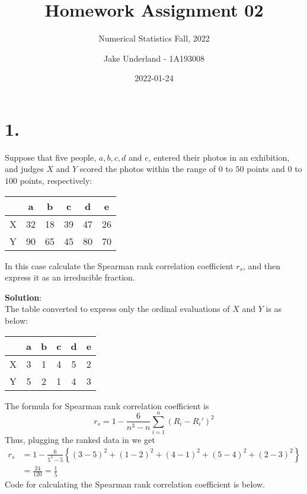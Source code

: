 \documentclass[
]{article}
\title{Homework Assignment 02}
\subtitle{Numerical Statistics Fall, 2022}
\author{Jake Underland - 1A193008}
\date{2022-01-24}
\begin{document}
\maketitle

\hypertarget{section}{%
\section{1.}\label{section}}

Suppose that five people, \(a, b, c, d\) and \(e\), entered their photos
in an exhibition, and judges \(X\) and \(Y\) scored the photos within
the range of \(0\) to \(50\) points and \(0\) to \(100\) points,
respectively:\\

\begin{center}
\begin{tabular}{|c|c|c|c|c|c|}
\hline
 & a & b & c & d & e\\
\hline
X & 32 & 18 & 39 & 47 & 26\\
\hline
Y & 90 & 65 & 45 & 80 & 70 \\
\hline
\end{tabular}
\end{center}

In this case calculate the Spearman rank correlation coefficient
\(r_s\), and then express it as an irreducible fraction.

\textbf{Solution}:\\
The table converted to express only the ordinal evaluations of \(X\) and
\(Y\) is as below:

\begin{center}
\begin{tabular}{|c|c|c|c|c|c|}
\hline
 & a & b & c & d & e\\
\hline
X & 3 & 1 & 4 & 5 & 2\\
\hline
Y & 5 & 2 & 1 & 4 & 3 \\
\hline
\end{tabular}
\end{center}

The formula for Spearman rank correlation coefficient is
\[r_s = 1 - \frac{6}{n^3-n} \sum^n_{i=1}(R_i - R_i')^2\] Thus, plugging
the ranked data in we get \[
\begin{aligned}
r_s &= 1 - \frac{6}{5^3-5} \left\{(3-5)^2 + (1 - 2)^2 + (4-1)^2 + (5-4)^2 + (2-3)^2\right\} \\
&= \frac{24}{120} = \frac{1}{5}
\end{aligned}
\] Code for calculating the Spearman rank correlation coefficient is
below.
\end{document}
